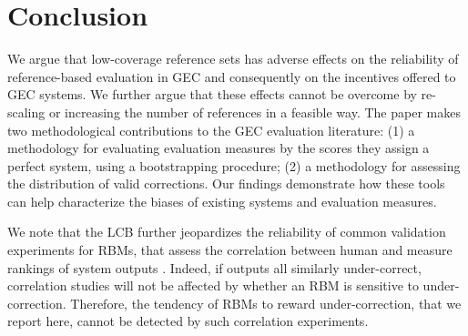 \documentclass[a4paper]{article}
\begin{document}
\section{Conclusion}\label{sec:conclusion}



We argue that low-coverage reference sets has adverse effects on the reliability
of reference-based evaluation in GEC and consequently on the incentives offered to GEC systems.
We further argue that these effects cannot be overcome by re-scaling or increasing the number of
references in a feasible way. 
The paper makes two methodological contributions to the GEC evaluation literature:
(1) a methodology for evaluating evaluation measures by the scores they assign a perfect system, using a bootstrapping procedure;
(2) a methodology for assessing the distribution of valid corrections.
Our findings demonstrate how these tools can help characterize the biases of existing systems and evaluation measures.

We note that the LCB further jeopardizes the reliability of common validation experiments for RBMs,
that assess the correlation between human and measure rankings of system outputs \cite{grundkiewicz2015human}.
Indeed, if outputs all similarly under-correct, correlation studies will not be affected by whether an RBM is sensitive to under-correction.
Therefore, the tendency of RBMs to reward under-correction, that we report here, 
cannot be detected by such correlation experiments.
\end{document}
